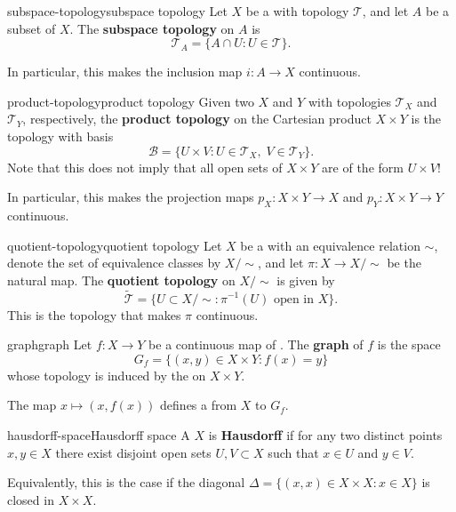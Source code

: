 \begin{topic}{subspace-topology}{subspace topology}
    Let $X$ be a  with topology $\mathcal{T}$, and let $A$ be a subset of $X$. The \textbf{subspace topology} on $A$ is
    \[ \mathcal{T}_A = \{ A \cap U : U \in \mathcal{T} \} . \]
    
    In particular, this makes the inclusion map $i : A \to X$ continuous.
\end{topic}

\begin{topic}{product-topology}{product topology}
    Given two  $X$ and $Y$ with topologies $\mathcal{T}_X$ and $\mathcal{T}_Y$, respectively, the \textbf{product topology} on the Cartesian product $X \times Y$ is the topology with basis
    \[ \mathcal{B} = \{ U \times V : U \in \mathcal{T}_X, \; V \in \mathcal{T}_Y \} . \]
    Note that this does not imply that all open sets of $X \times Y$ are of the form $U \times V$!
    
    In particular, this makes the projection maps $p_X : X \times Y \to X$ and $p_Y : X \times Y \to Y$ continuous.
\end{topic}

\begin{topic}{quotient-topology}{quotient topology}
    Let $X$ be a  with an equivalence relation $\sim{}$, denote the set of equivalence classes by $X / \sim{}$, and let $\pi : X \to X / \sim{}$ be the natural map. The \textbf{quotient topology} on $X / \sim{}$ is given by
    \[ \tilde{\mathcal{T}} = \{ U \subset X / \sim{} : \pi^{-1}(U) \text{ open in } X \} . \]
    This is the  topology that makes $\pi$ continuous.
\end{topic}

\begin{topic}{graph}{graph}
    Let $f : X \to Y$ be a continuous map of . The \textbf{graph} of $f$ is the space
    \[ G_f = \{ (x, y) \in X \times Y : f(x) = y \} \]
    whose topology is induced by the  on $X \times Y$.
    
    The map $x \mapsto (x, f(x))$ defines a  from $X$ to $G_f$.
\end{topic}

\begin{topic}{hausdorff-space}{Hausdorff space}
    A  $X$ is \textbf{Hausdorff} if for any two distinct points $x, y \in X$ there exist disjoint open sets $U, V \subset X$ such that $x \in U$ and $y \in V$.
    
    Equivalently, this is the case if the diagonal $\Delta = \{ (x, x) \in X \times X : x \in X \}$ is closed in $X \times X$.
\end{topic}

